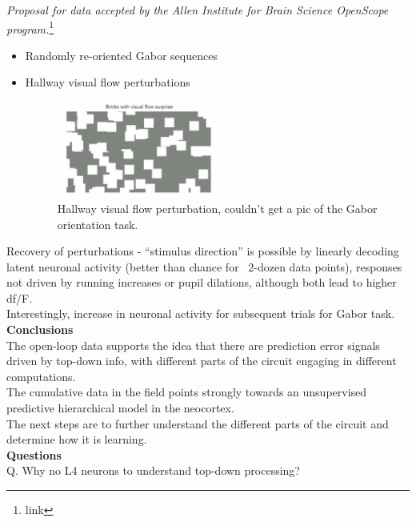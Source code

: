 \documentclass[12pt]{article}
\begin{document}
\textit{Proposal for data accepted by the Allen Institute for Brain Science OpenScope program.}\footnote{link}
 \begin{itemize}
     \item Randomly re-oriented Gabor sequences
     \item Hallway visual flow perturbations
     \begin{figure}
  \centering
      \includegraphics[width=0.5\textwidth]{images/hallway.png}
  \caption{Hallway visual flow perturbation, couldn't get a pic of the Gabor orientation task.}
\end{figure}
 \end{itemize}
 
Recovery of perturbations - ``stimulus direction'' is possible by linearly decoding latent neuronal activity (better than chance for ~2-dozen data points), responses not driven by running increases or pupil dilations, although both lead to higher df/F. \\

Interestingly, increase in neuronal activity for subsequent trials for Gabor task. \\

\textbf{Conclusions} \\

The open-loop data supports the idea that there are prediction error signals driven by top-down info, with different parts of the circuit engaging in different computations. \\

The cumulative data in the field points strongly towards an unsupervised predictive hierarchical model in the neocortex. \\

The next steps are to further understand the different parts of the circuit and determine how it is learning. \\

\textbf{Questions} \\

Q. Why no L4 neurons to understand top-down processing? \\
\end{document}
